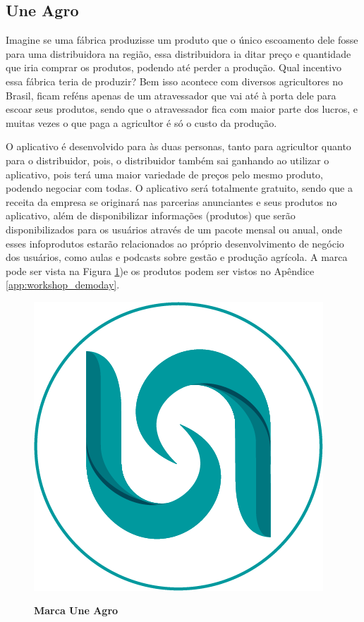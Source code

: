 \subsection{Une Agro}

Imagine se uma fábrica produzisse um produto que o único escoamento dele fosse para uma distribuidora na região, essa distribuidora ia ditar preço e quantidade que iria comprar os produtos, podendo até perder a produção. Qual incentivo essa fábrica teria de produzir? Bem isso acontece com diversos agricultores no Brasil, ficam reféns apenas de um atravessador que vai até à porta dele para escoar seus produtos, sendo que o atravessador fica com maior parte dos lucros, e muitas vezes o que paga a agricultor é só o custo da produção.

O aplicativo é desenvolvido para às duas personas, tanto para agricultor quanto para o distribuidor, pois, o distribuidor também sai ganhando ao utilizar o aplicativo, pois terá uma maior variedade de preços pelo mesmo produto, podendo negociar com todas. O aplicativo será totalmente gratuito, sendo que a receita da empresa se originará nas parcerias anunciantes e seus produtos no aplicativo, além de disponibilizar informações (produtos) que serão disponibilizados para os usuários através de um pacote mensal ou anual, onde esses infoprodutos estarão relacionados ao próprio desenvolvimento de negócio dos usuários, como aulas e podcasts sobre gestão e produção agrícola. A marca pode ser vista na Figura \ref{figura_28})e os produtos podem ser vistos no Apêndice \ref{app:workshop_demoday}.

\begin{figure}[H]
\centering
\caption{\textbf{Marca Une Agro}}
\includegraphics[scale=1.5]{Imagens/uneagro.png}
\label{figura_28}
\end{figure}




